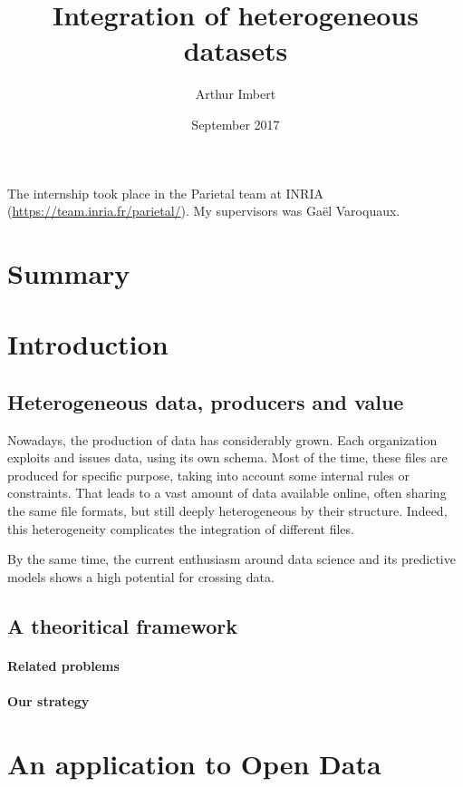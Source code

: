 \documentclass[a4paper]{article}
\author{Arthur Imbert}
\title{Integration of heterogeneous datasets}
\date{September 2017}
\begin{document}
	
	\maketitle
	
	The internship took place in the Parietal team at INRIA
	(\url{https://team.inria.fr/parietal/}). My supervisors was Ga\"el Varoquaux.
	
	\section{Summary}
	
	\section{Introduction}
	
	\subsection{Heterogeneous data, producers and value}
	
	Nowadays, the production of data has considerably grown. Each organization exploits and issues data, using its own schema. Most of the time, these files are produced for specific purpose, taking into account some internal rules or constraints. That leads to a vast amount of data available online, often sharing the same file formats, but still deeply heterogeneous by their structure. Indeed, this heterogeneity complicates the integration of different files.
	
	By the same time, the current enthusiasm around data science and its predictive models shows a high potential for crossing data. 
	
	\subsection{A theoritical framework}
	
	\paragraph{Related problems}
	
	\paragraph{Our strategy}
	
	\section{An application to Open Data}
	
\end{document}
